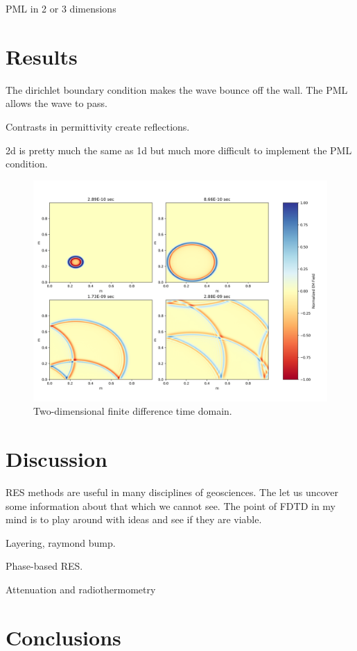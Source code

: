 \documentclass[a4paper]{article}
\begin{document}
PML in 2 or 3 dimensions

\section{Results}

The dirichlet boundary condition makes the wave bounce off the wall. The PML allows the wave to pass. 

Contrasts in permittivity create reflections. 

2d is pretty much the same as 1d but much more difficult to implement the PML condition. 

\begin{figure}
    \centering
    \includegraphics[width=\textwidth]{./Figures/2D_figure.png}
    \caption{Two-dimensional finite difference time domain.}
    \label{fig:2D}
\end{figure}

\section{Discussion}

RES methods are useful in many disciplines of geosciences. The let us uncover some information about that which we cannot see. The point of FDTD in my mind is to play around with ideas and see if they are viable. 

Layering, raymond bump.

Phase-based RES.

Attenuation and radiothermometry

\section{Conclusions}
\end{document}
